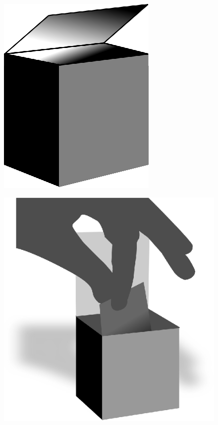\noindent
\begin{minipage}[b]{4.5cm}
\begin{figure}[H]
\centering
\includegraphics[scale=.9]{figure/fig_09.eps}
\caption{}\label{chap6-fig9}
\end{figure}
\end{minipage}
\qquad
\begin{minipage}[b]{5cm}
\begin{figure}[H]
\centering
\includegraphics[scale=.9]{figure/fig_10.eps}
\caption{}\label{chap6-fig10}
\end{figure}
\end{minipage}

